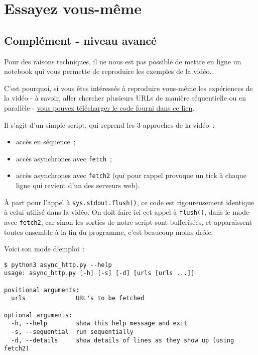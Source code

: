     
    
    
    

    

    \hypertarget{essayez-vous-muxeame}{%
\section{Essayez vous-même}\label{essayez-vous-muxeame}}

    \hypertarget{compluxe9ment---niveau-avancuxe9}{%
\subsection{Complément - niveau
avancé}\label{compluxe9ment---niveau-avancuxe9}}

    Pour des raisons techniques, il ne nous est pas possible de mettre en
ligne un notebook qui vous permette de reproduire les exemples de la
vidéo.

    C'est pourquoi, si vous êtes intéressés à reproduire vous-même les
expériences de la vidéo - à savoir, aller chercher plusieurs URLs de
manière séquentielle ou en parallèle - \href{data/async_http.py}{vous
pouvez télécharger le code fourni dans ce lien}.

    Il s'agit d'un simple script, qui reprend les 3 approches de la vidéo~:

\begin{itemize}
\tightlist
\item
  accès en séquence~;
\item
  accès asynchrones avec \texttt{fetch}~;
\item
  accès asynchrones avec \texttt{fetch2} (qui pour rappel provoque un
  tick à chaque ligne qui revient d'un des serveurs web).
\end{itemize}

À part pour l'appel à \texttt{sys.stdout.flush()}, ce code est
rigoureusement identique à celui utilisé dans la vidéo. On doit faire
ici cet appel à \texttt{flush()}, dans le mode avec \texttt{fetch2}, car
sinon les sorties de notre script sont bufferisées, et apparaissent
toutes ensemble à la fin du programme, c'est beaucoup moins drôle.

    Voici son mode d'emploi~:

    \begin{verbatim}
$ python3 async_http.py --help
usage: async_http.py [-h] [-s] [-d] [urls [urls ...]]

positional arguments:
  urls              URL's to be fetched

optional arguments:
  -h, --help        show this help message and exit
  -s, --sequential  run sequentially
  -d, --details     show details of lines as they show up (using fetch2)
\end{verbatim}

